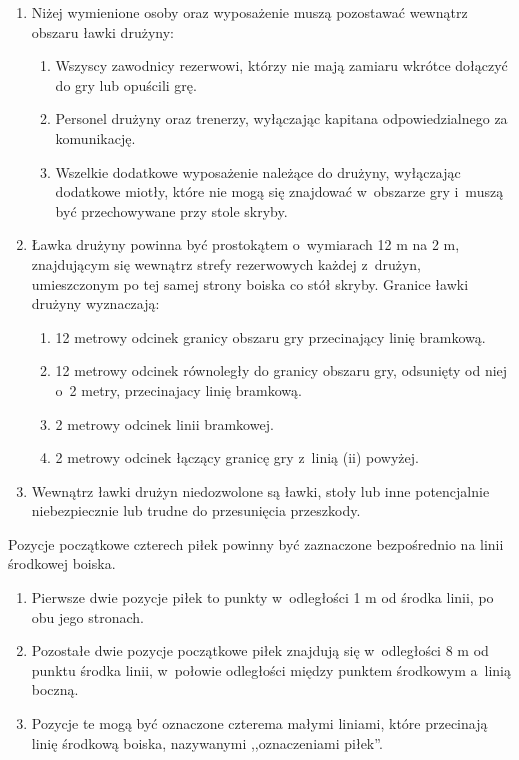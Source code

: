 \documentclass[12pt,a4paper]{article}
\renewcommand{\subsubsection}[1]{
  \oldsubsubsection{#1}%
  \leftskip1.5cm
}
\begin{document}
\begin{enumerate}
	\item Niżej wymienione osoby oraz wyposażenie muszą pozostawać wewnątrz
	      obszaru ławki drużyny:

	      \begin{enumerate}
		      \item Wszyscy zawodnicy rezerwowi, którzy nie mają zamiaru wkrótce
		            dołączyć do gry lub opuścili grę.
		      \item Personel drużyny oraz trenerzy, wyłączając kapitana odpowiedzialnego
		            za komunikację.
		      \item Wszelkie dodatkowe wyposażenie należące do drużyny, wyłączając
		            dodatkowe miotły, które nie mogą się znajdować w~obszarze gry i~muszą być przechowywane przy stole skryby.
	      \end{enumerate}

	\item Ławka drużyny powinna być prostokątem o~wymiarach 12 m na 2 m,
	      znajdującym się wewnątrz strefy rezerwowych każdej z~drużyn,
	      umieszczonym po tej samej strony boiska co stół skryby. Granice ławki
	      drużyny wyznaczają:

	      \begin{enumerate}
		      \item 12 metrowy odcinek granicy obszaru gry przecinający linię bramkową.
		      \item 12 metrowy odcinek równoległy do granicy obszaru gry, odsunięty od
		            niej o~2 metry, przecinajacy linię bramkową.
		      \item 2 metrowy odcinek linii bramkowej.
		      \item 2 metrowy odcinek łączący granicę gry z~linią (ii) powyżej.
	      \end{enumerate}

	\item Wewnątrz ławki drużyn niedozwolone są ławki, stoły lub inne
	      potencjalnie niebezpiecznie lub trudne do przesunięcia przeszkody.
\end{enumerate}

\subsubsection{Rozmieszczenie piłek}

Pozycje początkowe czterech piłek powinny być zaznaczone bezpośrednio na
linii środkowej boiska.
\begin{enumerate}
	\item Pierwsze dwie pozycje piłek to punkty w~odległości 1 m od środka
	      linii, po obu jego stronach.

	\item Pozostałe dwie pozycje początkowe piłek znajdują się w~odległości 8 m
	      od punktu środka linii, w~połowie odległości między punktem środkowym a~linią boczną.

	\item Pozycje te mogą być oznaczone czterema małymi liniami, które
	      przecinają linię środkową boiska, nazywanymi ,,oznaczeniami piłek''.
\end{enumerate}
\end{document}
